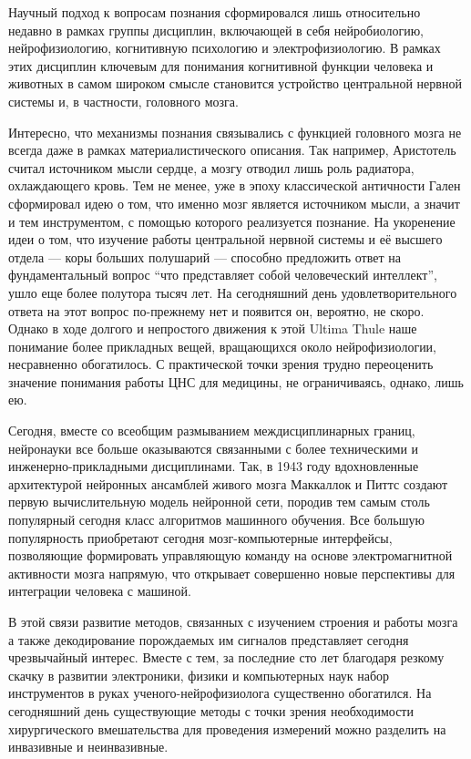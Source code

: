 Научный подход к вопросам познания сформировался лишь относительно недавно в рамках группы
дисциплин, включающей в себя нейробиологию, нейрофизиологию, когнитивную психологию и
электрофизиологию. В рамках этих дисциплин ключевым для понимания когнитивной функции человека
и животных в самом широком смысле становится устройство центральной нервной системы и, в частности,
головного мозга.

Интересно, что механизмы познания связывались с функцией головного мозга не всегда даже
в рамках материалистического описания. Так например, Аристотель считал источником мысли сердце,
а мозгу отводил лишь роль радиатора, охлаждающего кровь. Тем не менее, уже в эпоху классической
античности Гален сформировал идею о том, что именно мозг является источником мысли,
а значит и тем инструментом, с помощью которого реализуется познание.
На укоренение идеи о том, что изучение работы центральной нервной системы и её высшего отдела
--- коры больших полушарий --- способно предложить ответ на фундаментальный вопрос
“что представляет собой человеческий интеллект”, ушло еще более полутора тысяч лет.
На сегодняшний день удовлетворительного ответа на этот вопрос по-прежнему нет и появится он,
вероятно, не скоро. Однако в ходе  долгого и непростого движения к этой Ultima Thule
наше понимание более прикладных вещей, вращающихся около нейрофизиологии, несравненно обогатилось.
С практической точки зрения трудно переоценить значение понимания работы ЦНС для медицины, не ограничиваясь, однако, лишь ею.

Сегодня, вместе со всеобщим размыванием междисциплинарных границ, нейронауки все больше оказываются
связанными с более техническими и инженерно-прикладными дисциплинами.
Так, в 1943 году вдохновленные архитектурой нейронных ансамблей живого мозга Маккаллок и Питтс
создают первую вычислительную модель нейронной сети, породив тем самым столь популярный сегодня
класс алгоритмов машинного обучения. Все большую популярность приобретают сегодня мозг-компьютерные интерфейсы,
позволяющие формировать управляющую команду на основе электромагнитной активности мозга напрямую,
что открывает совершенно новые перспективы для интеграции человека с машиной.

В этой связи развитие методов, связанных с изучением строения и работы мозга а также декодирование
порождаемых им сигналов представляет сегодня чрезвычайный интерес.
Вместе с тем, за последние сто лет благодаря резкому скачку в развитии электроники,
физики и компьютерных наук набор инструментов в руках ученого-нейрофизиолога существенно обогатился.
На сегодняшний день существующие методы с точки зрения необходимости хирургического вмешательства
для проведения измерений можно разделить на инвазивные и неинвазивные.

